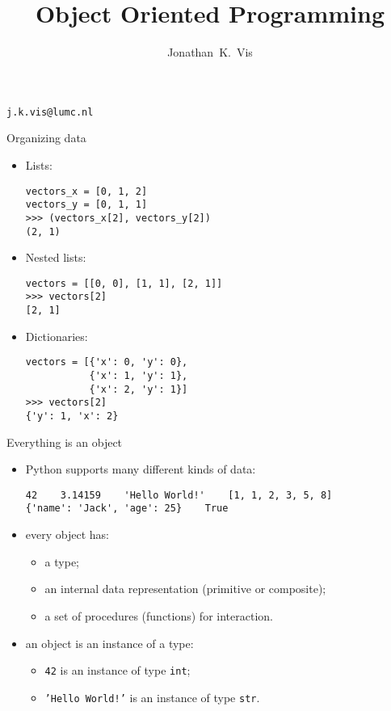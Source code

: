 \documentclass{beamer}
\author{Jonathan~K.~Vis}
\institute[LUMC]{Dept. of Human Genetics, Leiden University Medical Center}
\date{}
\title{Object Oriented Programming}
\begin{document}
\beamertemplatenavigationsymbolsempty

\begin{frame}
\titlepage
\vfill
\hfill \textcolor{pms280_compl}{\texttt{j.k.vis@lumc.nl}}
\end{frame}

\begin{frame}[fragile]{Organizing data}

\begin{itemize}
\item Lists:
\begin{verbatim}
vectors_x = [0, 1, 2]
vectors_y = [0, 1, 1]
>>> (vectors_x[2], vectors_y[2])
(2, 1)
\end{verbatim}

\item Nested lists:
\begin{verbatim}
vectors = [[0, 0], [1, 1], [2, 1]]
>>> vectors[2]
[2, 1]
\end{verbatim}

\item Dictionaries:
\begin{verbatim}
vectors = [{'x': 0, 'y': 0},
           {'x': 1, 'y': 1},
           {'x': 2, 'y': 1}]
>>> vectors[2]
{'y': 1, 'x': 2}
\end{verbatim}
\end{itemize}
\end{frame}

\begin{frame}[fragile]{Everything is an object}
\begin{itemize}
\item Python supports many different kinds of data:
\begin{verbatim}
42    3.14159    'Hello World!'    [1, 1, 2, 3, 5, 8]
{'name': 'Jack', 'age': 25}    True
\end{verbatim}

\item every \textcolor{pms280_compl}{object} has:
\begin{itemize}
\item a \textcolor{pms280_compl}{type};
\item an internal \textcolor{pms280_compl}{data representation}
(primitive or composite);
\item a set of \textcolor{pms280_compl}{procedures} (functions) for
interaction.
\end{itemize}

\item an object is an \textcolor{pms280_compl}{instance} of a type:
\begin{itemize}
\item \texttt{42} is an instance of type
\texttt{int};
\item \texttt{'Hello World!'} is an instance of type
\texttt{str}.
\end{itemize}
\end{itemize}
\end{frame}
\end{document}
